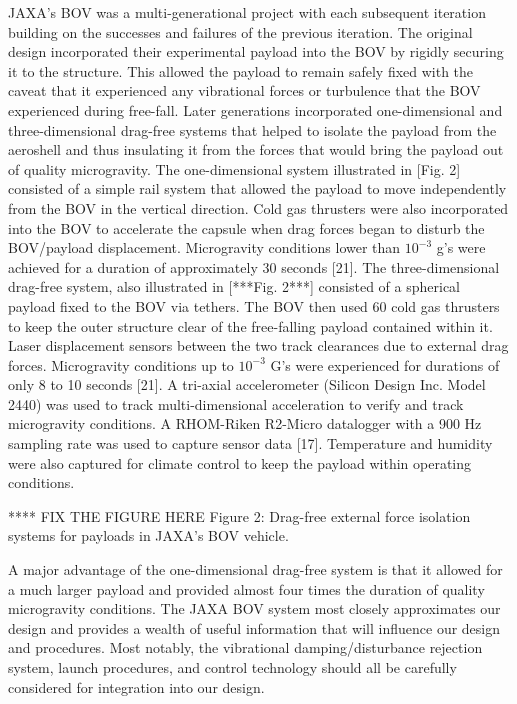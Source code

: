 \indent JAXA’s BOV was a multi-generational project with each subsequent iteration building on the successes and failures of the previous iteration. The original design incorporated their experimental payload into the BOV by rigidly securing it to the structure. This allowed the payload to remain safely fixed with the caveat that it experienced any vibrational forces or turbulence that the BOV experienced during free-fall. Later generations incorporated one-dimensional and three-dimensional drag-free systems that helped to isolate the payload from the aeroshell and thus insulating it from the forces that would bring the payload out of quality microgravity. The one-dimensional system illustrated in [Fig. 2] consisted of a simple rail system that allowed the payload to move independently from the BOV in the vertical direction. Cold gas thrusters were also incorporated into the BOV to accelerate the capsule when drag forces began to disturb the BOV/payload displacement. Microgravity conditions lower than $10^{−3}$ g’s were achieved for a duration of approximately 30 seconds [21]. The three-dimensional drag-free system, also illustrated in [***Fig. 2***] consisted of a spherical payload fixed to the BOV via tethers. The BOV then used 60 cold gas thrusters to keep the outer structure clear of the free-falling payload contained within it. Laser displacement sensors between the two track clearances due to external drag forces. Microgravity conditions up to $10^{−3}$ G’s were experienced for durations of only 8 to 10 seconds [21]. A tri-axial accelerometer (Silicon Design Inc. Model 2440) was used to track multi-dimensional acceleration to verify and track microgravity conditions. A RHOM-Riken R2-Micro datalogger with a 900 Hz sampling rate was used to capture sensor data [17]. Temperature and humidity were also captured for climate control to keep the payload within operating conditions.

**** FIX THE FIGURE HERE 
Figure 2: Drag-free external force isolation systems for payloads in JAXA’s BOV vehicle.

\indent A major advantage of the one-dimensional drag-free system is that it allowed for a much larger payload and provided almost four times the duration of quality microgravity conditions. The JAXA BOV system most closely approximates our design and provides a wealth of useful information that will influence our design and procedures. Most notably, the vibrational damping/disturbance rejection system, launch procedures, and control technology should all be carefully considered for integration into our design.


